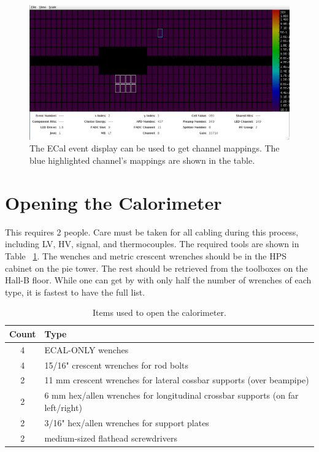 \documentclass[12pt]{article}
\begin{document}
{\begin{figure}[htbp]\centering
    \includegraphics[width=16cm]{pics/kylesGui.png}
    \caption{The ECal event display can be used to get channel mappings.  The blue highlighted channel's mappings are shown in the table.\label{fig:kylesGui}}
\end{figure}

\section{Opening the Calorimeter}

This requires 2 people.  Care must be taken for all cabling during this process, including LV, HV, signal, and thermocouples.  The required tools are shown in Table ~\ref{tab:tools}.  The wenches and metric crescent wrenches should be in the HPS cabinet on the pie tower.  The rest should be retrieved from the toolboxes on the Hall-B floor.  While one can get by with only half the number of wrenches of each type, it is fastest to have the full list. 

\begin{table}[htbp]\centering
    \begin{tabular}{c|l}\hline
        Count & Type \\\hline
4&   ECAL-ONLY wenches\\
4&   15/16" crescent wrenches for rod bolts\\
2&   11 mm crescent wrenches for lateral cossbar supports (over beampipe)\\
2&   6 mm hex/allen wrenches for longitudinal crossbar supports (on far left/right)\\
2&   3/16" hex/allen wrenches for support plates\\
2&   medium-sized flathead screwdrivers\\\hline
    \end{tabular}
    \caption{Items used to open the calorimeter. \label{tab:tools}}
\end{table}

}
\end{document}
